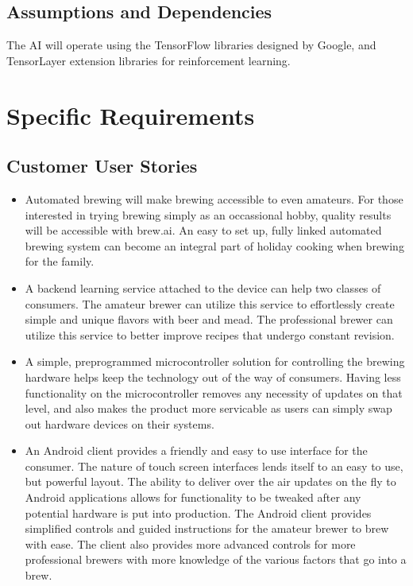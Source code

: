 \documentclass[draftclsnofoot,onecolumn,letterpaper,10pt]{IEEEtran}
\begin{document}
\subsection{Assumptions and Dependencies}
The AI will operate using the TensorFlow libraries designed by Google, and TensorLayer extension libraries for reinforcement learning.

\section{Specific Requirements}
\subsection{Customer User Stories}
\begin{itemize}
	\item Automated brewing will make brewing accessible to even amateurs. For those interested in trying brewing simply as an
		occassional hobby, quality results will be accessible with brew.ai. An easy to set up, fully linked automated brewing system can
		become an integral part of holiday cooking when brewing for the family.
	\item A backend learning service attached to the device can help two classes of consumers. The amateur brewer can utilize this 
		service to effortlessly create simple and unique flavors with beer and mead. The professional brewer can utilize this service
		to better improve recipes that undergo constant revision.
	\item A simple, preprogrammed microcontroller solution for controlling the brewing hardware helps keep the technology out of the way
		of consumers. Having less functionality on the microcontroller removes any necessity of updates on that level, and also makes
		the product more servicable as users can simply swap out hardware devices on their systems.
	\item An Android client provides a friendly and easy to use interface for the consumer. The nature of touch screen interfaces lends 
		itself to an easy to use, but powerful layout. The ability to deliver over the air updates on the fly to Android applications
		allows for functionality to be tweaked after any potential hardware is put into production. The Android client provides simplified
		controls and guided instructions for the amateur brewer to brew with ease. The client also provides more advanced controls for more
		professional brewers with more knowledge of the various factors that go into a brew.
\end{itemize}
\end{document}
